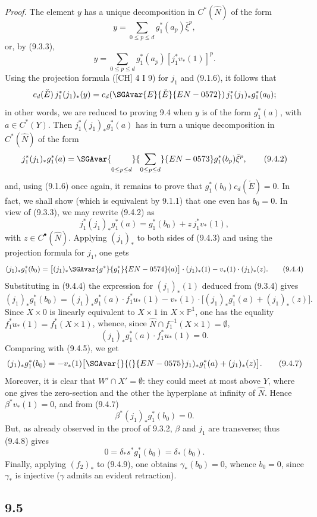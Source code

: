 \emph{Proof.} The element $y$ has a unique decomposition in $C^*(\widehat N)$ of the form
\[
y=\sum_{0\le p\le d}g_1^*(a_p)\bar\xi^p,
\]
or, by (9.3.3),
\[
y=\sum_{0\le p\le d}g_1^*(a_p)[j_1^*v_*(1)]^p.
\tag{9.4.1}
\]
Using the projection formula ([CH] 4 I 9) for $j_1$ and (9.1.6), it follows that
\[
c_d(\check E)\,j_1^*(j_1)_*(y)=c_d(\SGAvar{ E}{\check E}{EN-0572})\,j_1^*(j_1)_*g_1^*(a_0);
\]
in other words, we are reduced to proving 9.4 when $y$ is of the form $g_1^*(a)$, with $a\in C^*(Y)$. Then $j_1^*(j_1)_*g_1^*(a)$ has in turn a unique decomposition in $C^*(\widehat N)$ of the form
\[
j_1^*(j_1)_*g_1^*(a)=\SGAvar{\mathop{\phantom{\sum}}\limits_{0\le p\le d}}{\sum_{0\le p\le d}}{EN-0573}g_1^*(b_p)\bar\xi^p,
\tag{9.4.2}
\]
and, using (9.1.6) once again, it remains to prove that $g_1^*(b_0)c_d(\check E)=0$. In fact, we shall show (which is equivalent by 9.1.1) that one even has $b_0=0$. In view of (9.3.3), we may rewrite (9.4.2) as
\[
j_1^*(j_1)_*g_1^*(a)=g_1^*(b_0)+z\,j_1^*v_*(1),
\tag{9.4.3}
\]
with $z\in C^{\bullet}(\widehat N)$. Applying $(j_1)_*$ to both sides of (9.4.3) and using the projection formula for $j_1$, one gets
\[
(j_1)_*g_1^*(b_0)=\bigl[(j_1)_*\SGAvar{g^*}{g_1^*}{EN-0574}(a)\bigr]\cdot(j_1)_*(1)-v_*(1)\cdot(j_1)_*(z).
\tag{9.4.4}
\]
Substituting in (9.4.4) the expression for $(j_1)_*(1)$ deduced from (9.3.4) gives
\[
(j_1)_*g_1^*(b_0)=
(j_1)_*g_1^*(a)\cdot f_1^*u_*(1)-v_*(1)\cdot\bigl[(j_1)_*g_1^*(a)+(j_1)_*(z)\bigr].
\tag{9.4.5}
\]
Since $X\times0$ is linearly equivalent to $X\times1$ in $X\times\mathbb P^1$, one has the equality $f_1^*u_*(1)=f_1^*(X\times1)$, whence, since $\widehat N\cap f_1^{-1}(X\times1)=\emptyset$,
\[
(j_1)_*g_1^*(a)\cdot f_1^*u_*(1)=0.
\tag{9.4.6}
\]
Comparing with (9.4.5), we get
\[
(j_1)_*g_1^*(b_0)=-v_*(1)\bigl[\SGAvar{}{(}{EN-0575}j_1)_*g_1^*(a)+(j_1)_*(z)\bigr].
\tag{9.4.7}
\]
Moreover, it is clear that $W'\cap X'=\emptyset$: they could meet at most above $Y$, where one gives the zero-section and the other the hyperplane at infinity of $\widehat N$. Hence $\beta^*v_*(1)=0$, and from (9.4.7)
\[
\beta^*(j_1)_*g_1^*(b_0)=0.
\tag{9.4.8}
\]
But, as already observed in the proof of 9.3.2, $\beta$ and $j_1$ are transverse; thus (9.4.8) gives
\[
0=\delta_*s^*g_1^*(b_0)=\delta_*(b_0).
\tag{9.4.9}
\]
Finally, applying $(f_2)_*$ to (9.4.9), one obtains $\gamma_*(b_0)=0$, whence $b_0=0$, since $\gamma_*$ is injective ($\gamma$ admits an evident retraction).

\subsection*{9.5}

